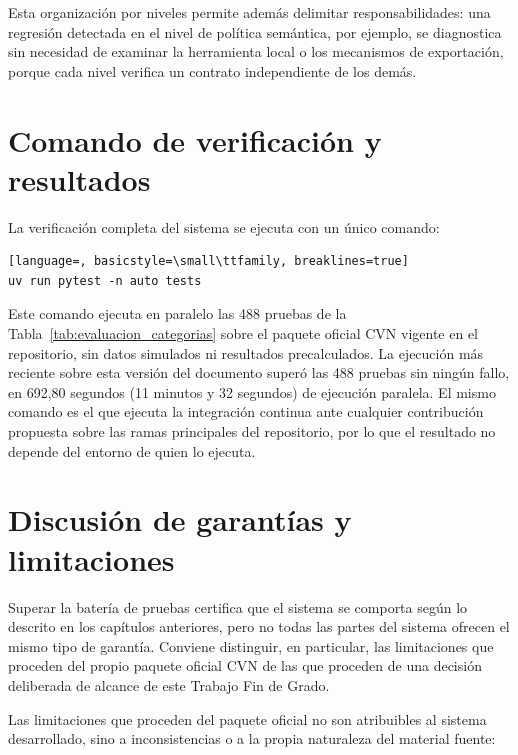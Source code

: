 Esta organización por niveles permite además delimitar responsabilidades:
una regresión detectada en el nivel de política semántica, por ejemplo, se
diagnostica sin necesidad de examinar la herramienta local o los mecanismos
de exportación, porque cada nivel verifica un contrato independiente de los
demás.

\section{Comando de verificación y resultados}
\label{sec:evaluacion_comando}

La verificación completa del sistema se ejecuta con un único comando:

\begin{code}[htbp]
\begin{lstlisting}[language=, basicstyle=\small\ttfamily, breaklines=true]
uv run pytest -n auto tests
\end{lstlisting}
\caption{Comando principal de verificación del sistema.}
\label{cod:evaluacion_comando}
\end{code}

Este comando ejecuta en paralelo las 488 pruebas de la Tabla~\ref{tab:evaluacion_categorias}
sobre el paquete oficial CVN vigente en el repositorio, sin datos simulados
ni resultados precalculados. La ejecución más reciente sobre esta versión
del documento superó las 488 pruebas sin ningún fallo, en 692,80 segundos
(11 minutos y 32 segundos) de ejecución paralela. El mismo comando es el que
ejecuta la integración continua ante cualquier contribución propuesta sobre
las ramas principales del repositorio, por lo que el resultado no depende
del entorno de quien lo ejecuta.

\section{Discusión de garantías y limitaciones}
\label{sec:evaluacion_discusion}

Superar la batería de pruebas certifica que el sistema se comporta según lo
descrito en los capítulos anteriores, pero no todas las partes del sistema
ofrecen el mismo tipo de garantía. Conviene distinguir, en particular, las
limitaciones que proceden del propio paquete oficial CVN de las que
proceden de una decisión deliberada de alcance de este Trabajo Fin de Grado.

Las limitaciones que proceden del paquete oficial no son atribuibles al
sistema desarrollado, sino a inconsistencias o a la propia naturaleza del
material fuente:

